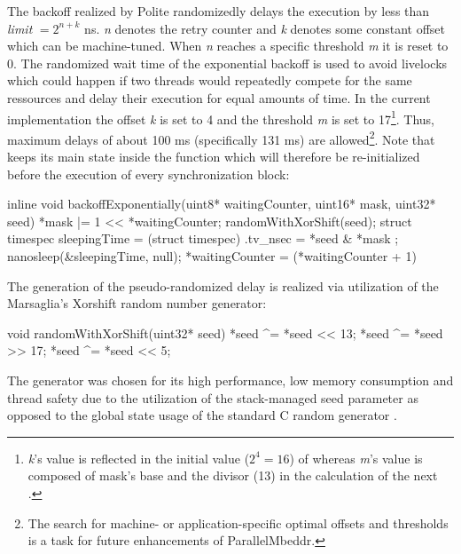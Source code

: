 The backoff realized by Polite randomizedly delays the execution  by less than \textit{limit} $ = 2^{n+k}$ ns\cite{AdvancedContentionManagement}. \textit{n} denotes the retry counter and \textit{k} denotes some constant offset which can be machine-tuned. When \textit{n} reaches a specific threshold \textit{m} it is reset to 0. The randomized wait time of the exponential backoff is used to avoid livelocks which could happen if two threads would repeatedly compete for the same ressources and delay their execution for equal amounts of time. In the current implementation  the offset \textit{k} is set to 4 and the threshold \textit{m} is set to 17\footnote{\textit{k}'s value is reflected in the initial value ($2^4 = 16$) of  whereas \textit{m}'s value is composed of mask's base and the divisor (13) in the calculation of the next .}. Thus, maximum delays of about 100 ms (specifically 131 ms) are allowed\footnote{The search for machine- or application-specific optimal offsets and thresholds is a task for future enhancements of ParallelMbeddr.}. Note that  keeps its main state inside the  function which will therefore be re-initialized before the execution of every synchronization block:
\begin{ccode}
inline void backoffExponentially(uint8* waitingCounter, uint16* mask, uint32* seed) { 
  *mask |= 1 << *waitingCounter; 
  randomWithXorShift(seed); 
  struct timespec sleepingTime = (struct timespec){ .tv_nsec = *seed & *mask }; 
  nanosleep(&sleepingTime, null); 
  *waitingCounter = (*waitingCounter + 1) %
}
\end{ccode}

The generation of the pseudo-randomized delay is realized via utilization of the Marsaglia's Xorshift random number generator\cite{XorshiftRngs}:
\begin{ccode}
void randomWithXorShift(uint32* seed) { 
  *seed ^= *seed << 13; 
  *seed ^= *seed >> 17; 
  *seed ^= *seed << 5; 
}
\end{ccode}
The generator was chosen for its high performance, low memory consumption and thread safety due to the utilization of the stack-managed seed parameter as opposed to the global state usage of the standard C random generator .
